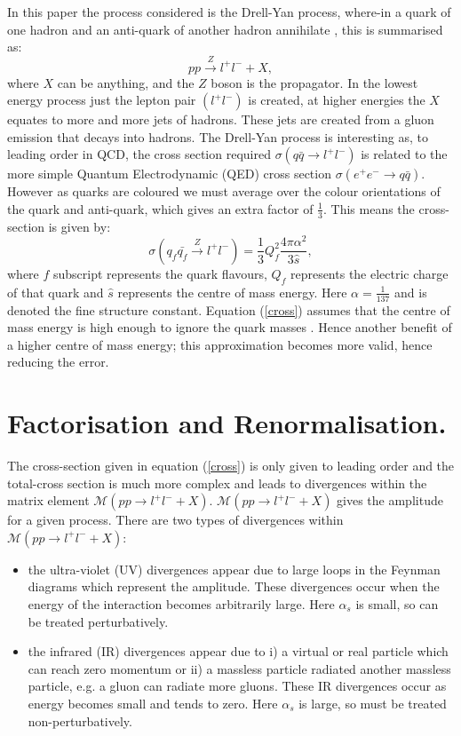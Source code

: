 \documentclass[12pt, onecolumn]{revtex4}    %
\begin{document}
In this paper the process considered is the Drell-Yan process, where-in a quark of one hadron and an anti-quark of another hadron annihilate \cite{BOOK}, this is summarised as: \begin{equation} pp \xrightarrow{Z}  l^+l^- + X, \end{equation} where ${X}$ can be anything, and the ${Z}$ boson is the propagator. In the lowest energy process just the lepton pair ${(l^+l^-)}$ is created, at higher energies the ${X}$ equates to more and more jets of hadrons. These jets are  created from a gluon emission that decays into hadrons. The Drell-Yan process is interesting as, to leading order in QCD, the cross section required ${\sigma(q\bar{q} \rightarrow l^+l^-)}$ is related to the more simple Quantum Electrodynamic (QED) cross section ${\sigma(e^+e^- \rightarrow q \bar{q})}$. However as quarks are coloured we must average over the colour orientations of the quark and anti-quark, which gives an extra factor of ${\frac{1}{3}}$. This means the cross-section is given by: \begin{equation} \label{cross} \sigma(q_f\bar{q_f} \xrightarrow{Z} l^+l^-) = \frac{1}{3}Q_f^2 \dfrac{4\pi\alpha^2}{3\hat{s}}, \end{equation} where ${f}$ subscript represents the quark flavours, ${Q_f}$ represents the electric charge of that quark and ${\hat{s}}$ represents the centre of mass energy. Here ${\alpha = \frac{1}{137}}$ and is denoted the fine structure constant. Equation (\ref{cross}) assumes that the centre of mass energy is high enough to ignore the quark masses \cite{BOOK}. Hence another benefit of a higher centre of mass energy; this approximation becomes more valid, hence reducing the error.

\section{Factorisation and Renormalisation.} 
The cross-section given in equation (\ref{cross}) is only given to leading order and the total-cross section is much more complex and leads to divergences within the matrix element ${\mathcal{M} (pp \rightarrow l^+l^- + X )}$. ${\mathcal{M} (pp \rightarrow l^+l^- + X)}$ gives the amplitude for a given process. There are two types of divergences within ${\mathcal{M} (pp \rightarrow l^+l^- + X)}$: 
\begin{itemize}
	\item the ultra-violet (UV) divergences appear due to large loops in the Feynman diagrams which represent the amplitude. These divergences occur when the energy of the interaction becomes arbitrarily large. Here ${\alpha_s}$ is small, so can be treated perturbatively.
	\item the infrared (IR) divergences appear due to i) a virtual or real particle which can reach zero momentum or ii) a massless particle radiated another massless particle, e.g. a gluon can radiate more gluons. These IR divergences occur as energy becomes small and tends to zero. Here ${\alpha_s}$ is large, so must be treated non-perturbatively.
\end{itemize}
\end{document}
